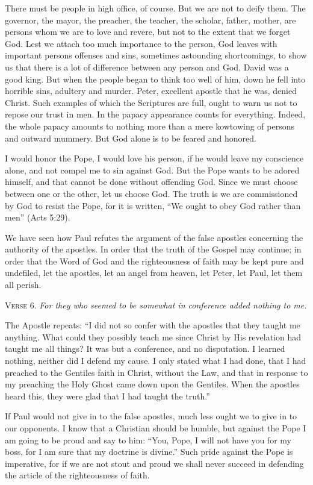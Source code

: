 There must be people in high office, of course. But we are not to deify them. The governor, the mayor, the preacher, the teacher, the scholar, father, mother, are persons whom we are to love and revere, but not to the extent that we forget God. Lest we attach too much importance to the person, God leaves with important persons offenses and sins, sometimes astounding shortcomings, to show us that there is a lot of difference between any person and God. David was a good king. But when the people began to think too well of him, down he fell into horrible sins, adultery and murder. Peter, excellent apostle that he was, denied Christ. Such examples of which the Scriptures are full, ought to warn us not to repose our trust in men. In the papacy appearance counts for everything. Indeed, the whole papacy amounts to nothing more than a mere kowtowing of persons and outward mummery. But God alone is to be feared and honored.

I would honor the Pope, I would love his person, if he would leave my conscience alone, and not compel me to sin against God. But the Pope wants to be adored himself, and that cannot be done without offending God. Since we must choose between one or the other, let us choose God. The truth is we are commissioned by God to resist the Pope, for it is written, “We ought to obey God rather than men” (Acts 5:29).

We have seen how Paul refutes the argument of the false apostles concerning the authority of the apostles. In order that the truth of the Gospel may continue; in order that the Word of God and the righteousness of faith may be kept pure and undefiled, let the apostles, let an angel from heaven, let Peter, let Paul, let them all perish.

\textsc{Verse} 6. \emph{For they who seemed to be somewhat in conference added nothing to me.}

The Apostle repeats: “I did not so confer with the apostles that they taught me anything. What could they possibly teach me since Christ by His revelation had taught me all things? It was but a conference, and no disputation. I learned nothing, neither did I defend my cause. I only stated what I had done, that I had preached to the Gentiles faith in Christ, without the Law, and that in response to my preaching the Holy Ghost came down upon the Gentiles. When the apostles heard this, they were glad that I had taught the truth.”

If Paul would not give in to the false apostles, much less ought we to give in to our opponents. I know that a Christian should be humble, but against the Pope I am going to be proud and say to him: “You, Pope, I will not have you for my boss, for I am sure that my doctrine is divine.” Such pride against the Pope is imperative, for if we are not stout and proud we shall never succeed in defending the article of the righteousness of faith.

